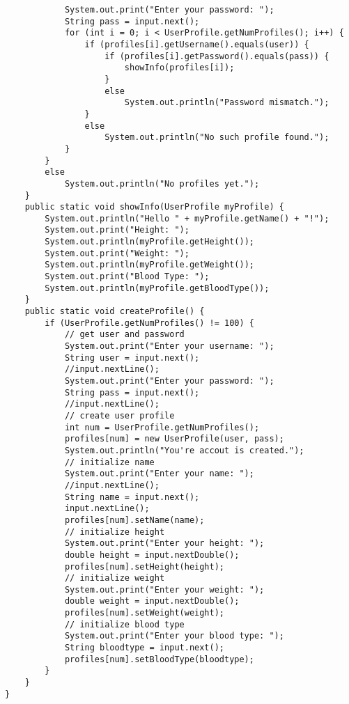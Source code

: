 \documentclass[12pt,letterpaper,twoside]{article}
\begin{document}
\begin{enumerate}
\begin{lstlisting}
			System.out.print("Enter your password: ");
			String pass = input.next();
			for (int i = 0; i < UserProfile.getNumProfiles(); i++) {
				if (profiles[i].getUsername().equals(user)) {
					if (profiles[i].getPassword().equals(pass)) {
						showInfo(profiles[i]);
					}
					else
						System.out.println("Password mismatch.");
				}
				else
					System.out.println("No such profile found.");
			}
		}
		else
			System.out.println("No profiles yet.");
	}
	public static void showInfo(UserProfile myProfile) {
		System.out.println("Hello " + myProfile.getName() + "!");
		System.out.print("Height: ");
		System.out.println(myProfile.getHeight());
		System.out.print("Weight: ");
		System.out.println(myProfile.getWeight());
		System.out.print("Blood Type: ");
		System.out.println(myProfile.getBloodType());
	}
	public static void createProfile() {
		if (UserProfile.getNumProfiles() != 100) {
			// get user and password
			System.out.print("Enter your username: ");
			String user = input.next();
			//input.nextLine();
			System.out.print("Enter your password: ");
			String pass = input.next();
			//input.nextLine();
			// create user profile
			int num = UserProfile.getNumProfiles();
			profiles[num] = new UserProfile(user, pass);
			System.out.println("You're accout is created.");
			// initialize name
			System.out.print("Enter your name: ");
			//input.nextLine();
			String name = input.next();
			input.nextLine();
			profiles[num].setName(name);
			// initialize height
			System.out.print("Enter your height: ");
			double height = input.nextDouble();
			profiles[num].setHeight(height);
			// initialize weight
			System.out.print("Enter your weight: ");
			double weight = input.nextDouble();
			profiles[num].setWeight(weight);
			// initialize blood type
			System.out.print("Enter your blood type: ");
			String bloodtype = input.next();
			profiles[num].setBloodType(bloodtype);
		}
	}
}
\end{lstlisting}
\end{enumerate}
\end{document}
